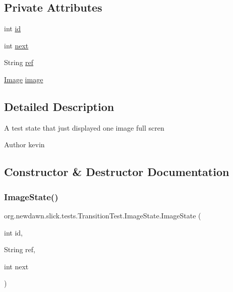 \subsection*{Private Attributes}
\begin{DoxyCompactItemize}
\item 
int \mbox{\hyperlink{classorg_1_1newdawn_1_1slick_1_1tests_1_1_transition_test_1_1_image_state_a4160846ad41a9f74b96e40e7f4a15237}{id}}
\item 
int \mbox{\hyperlink{classorg_1_1newdawn_1_1slick_1_1tests_1_1_transition_test_1_1_image_state_a91322399fc4bdbdba33cfe81524adb59}{next}}
\item 
String \mbox{\hyperlink{classorg_1_1newdawn_1_1slick_1_1tests_1_1_transition_test_1_1_image_state_a8aa86f789ef4cf8dbcd93a9de42d0e1c}{ref}}
\item 
\mbox{\hyperlink{classorg_1_1newdawn_1_1slick_1_1_image}{Image}} \mbox{\hyperlink{classorg_1_1newdawn_1_1slick_1_1tests_1_1_transition_test_1_1_image_state_a930e1e326fbc77f8b9c47f6c04718744}{image}}
\end{DoxyCompactItemize}


\subsection{Detailed Description}
A test state that just displayed one image full scren

\begin{DoxyAuthor}{Author}
kevin 
\end{DoxyAuthor}


\subsection{Constructor \& Destructor Documentation}
\mbox{\label{classorg_1_1newdawn_1_1slick_1_1tests_1_1_transition_test_1_1_image_state_ac1f4535c06d2b734e1edbe3ce6635304}} 
\subsubsection{\texorpdfstring{Image\+State()}{ImageState()}}
{\footnotesize\ttfamily org.\+newdawn.\+slick.\+tests.\+Transition\+Test.\+Image\+State.\+Image\+State (\begin{DoxyParamCaption}\item[{int}]{id,  }\item[{String}]{ref,  }\item[{int}]{next }\end{DoxyParamCaption})\hspace{0.3cm}{\ttfamily [inline]}}

